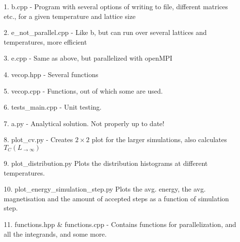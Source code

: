 \documentclass[10pt,a4paper]{article}
\begin{document}
\begin{itemize}
\item[1.] b.cpp - Program with several options of writing to file, different matrices etc., for a given temperature and lattice size
\item[2.] e\_not\_parallel.cpp - Like b, but can run over several lattices and temperatures, more efficient
\item[3.] e.cpp - Same as above, but parallelized with openMPI
\item[4.] vecop.hpp - Several functions
\item[5.] vecop.cpp - Functions, out of which some are used.
\item[6.] tests\_main.cpp - Unit testing.
\item[7.] a.py - Analytical solution. Not properly up to date!
\item[8.] plot\_cv.py - Creates $2\times2$ plot for the larger simulations, also calculates $T_C(L_{\rightarrow \infty})$
\item[9.] plot\_distribution.py Plots the distribution histograms at different temperatures.
\item[10.] plot\_energy\_simulation\_step.py Plots the  avg. energy, the avg. magnetisation and the amount of accepted steps as a function of simulation step.
\item[11.] functions.hpp \& functions.cpp - Contains functions for parallelization, and all the integrands, and some more.
\end{itemize}









\begin{comment}

$$
\begin{bmatrix}
0 & 0 & 0 & 0 \\
0 & 0 & 0 & 0 \\
0 & 0 & 0 & 0 \\
0 & 0 & 0 & 0 \\
\end{bmatrix}
$$

\begin{lstlisting}[caption=insert caption]
for (unsigned int i = 0; i<100;i++{
}
\end{lstlisting}

\begin{figure}[h]
\texttt{[image: ]}
\caption{include caption}
\end{figure}

\end{comment}
\end{document}
